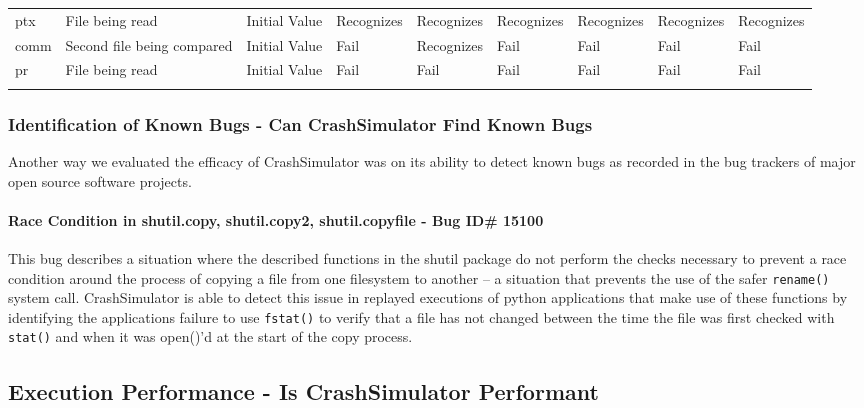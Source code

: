 \begin{table*}[t]
\begin{tabular}{l  l  l  l  l  l  l  l  l}
                  ptx         & File being read            & Initial Value  & Recognizes     & Recognizes  & Recognizes & Recognizes  & Recognizes & Recognizes\\
                  comm        & Second file being compared & Initial Value  & Fail           & Recognizes  & Fail       & Fail        & Fail       & Fail\\
                  pr          & File being read            & Initial Value  & Fail           & Fail        & Fail       & Fail        & Fail       & Fail\\
                \bottomrule{}
                \end{tabular}
            \end{table*}

        \subsubsection{Identification of Known Bugs - Can CrashSimulator Find Known Bugs}

        Another way we evaluated the efficacy of CrashSimulator was on its ability to detect known bugs as recorded in
        the bug trackers of major open source software projects.

            \paragraph{Race Condition in shutil.copy, shutil.copy2, shutil.copyfile - Bug ID\# 15100}
              
            This bug describes a situation where the described functions in the shutil package do not perform the checks
            necessary to prevent a race condition around the process of copying a file from one filesystem to another --
            a situation that prevents the use of the safer {\tt rename()} system call.  CrashSimulator is able to detect this
            issue in replayed executions of python applications that make use of these functions by identifying the
            applications failure to use {\tt fstat()} to verify that a file has not changed between the time the file was
            first checked with {\tt stat()} and when it was open()'d at the start of the copy process.
        


    \subsection{Execution Performance - Is CrashSimulator Performant}

